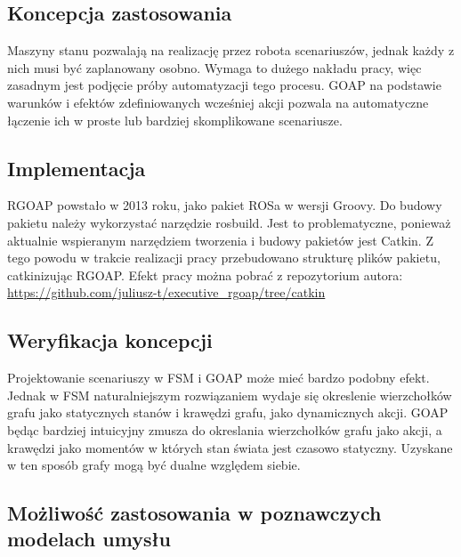 \subsection{Koncepcja zastosowania}
Maszyny stanu pozwalają na realizację przez robota scenariuszów, jednak każdy z nich musi być zaplanowany osobno. Wymaga to dużego nakładu pracy, więc zasadnym jest podjęcie próby automatyzacji tego procesu. GOAP na podstawie warunków i efektów zdefiniowanych wcześniej akcji pozwala na automatyczne łączenie ich w proste lub bardziej skomplikowane scenariusze. 

\subsection{Implementacja}
RGOAP powstało w 2013 roku, jako pakiet ROSa w wersji Groovy. Do budowy pakietu należy wykorzystać narzędzie rosbuild. Jest to problematyczne, ponieważ aktualnie wspieranym narzędziem tworzenia i budowy pakietów jest Catkin. Z tego powodu w trakcie realizacji pracy przebudowano strukturę plików pakietu, catkinizując RGOAP. Efekt pracy można pobrać z repozytorium autora: \url{https://github.com/juliusz-t/executive_rgoap/tree/catkin}

\subsection{Weryfikacja koncepcji}

Projektowanie scenariuszy w FSM i GOAP może mieć bardzo podobny efekt. Jednak w FSM naturalniejszym rozwiązaniem wydaje się okreslenie wierzchołków grafu jako statycznych stanów i krawędzi grafu, jako dynamicznych akcji. GOAP będąc bardziej intuicyjny zmusza do okreslania wierzchołków grafu jako akcji, a krawędzi jako momentów w których stan świata jest czasowo statyczny. Uzyskane w ten sposób grafy mogą być dualne względem siebie.

\subsection{Możliwość zastosowania w poznawczych modelach umysłu}

